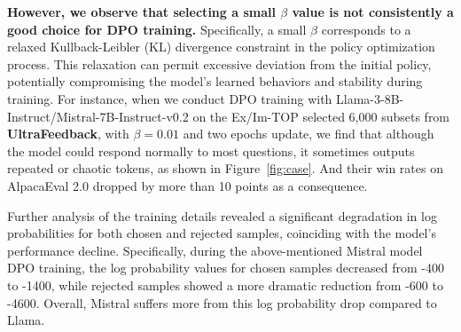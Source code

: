 \begin{table}[h]
    \centering
    \setlength{\abovecaptionskip}{0.1cm}
    \setlength{\belowcaptionskip}{0cm}
    \setlength{\tabcolsep}{9pt} 
    \caption{Ablation study on $\beta$ ($\beta=0.01$): performance comparison of methods trained on Llama-Ultrafeedback dataset, benchmarked against state-of-the-art algorithms trained on the complete dataset.}
    \label{tab:abl_beta}
    \tiny
    \vspace{-10pt}
\end{table}

\textbf{However, we observe that selecting a small $\beta$ value is not consistently a good choice for DPO training.} Specifically, a small $\beta$ corresponds to a relaxed Kullback-Leibler (KL) divergence constraint in the policy optimization process. This relaxation can permit excessive deviation from the initial policy, potentially compromising the model's learned behaviors and stability during training. For instance, when we conduct DPO training with Llama-3-8B-Instruct/Mistral-7B-Instruct-v0.2 on the Ex/Im-TOP selected 6,000 subsets from \textbf{UltraFeedback}, with $\beta=0.01$ and two epochs update, we find that although the model could respond normally to most questions, it sometimes outputs repeated or chaotic tokens, as shown in Figure~\ref{fig:case}. And their win rates on AlpacaEval 2.0 dropped by more than 10 points as a consequence. 

Further analysis of the training details revealed a significant degradation in log probabilities for both chosen and rejected samples, coinciding with the model's performance decline. Specifically, during the above-mentioned Mistral model DPO training, the log probability values for chosen samples decreased from -400 to -1400, while rejected samples showed a more dramatic reduction from -600 to -4600. Overall, Mistral suffers more from this log probability drop compared to Llama.

